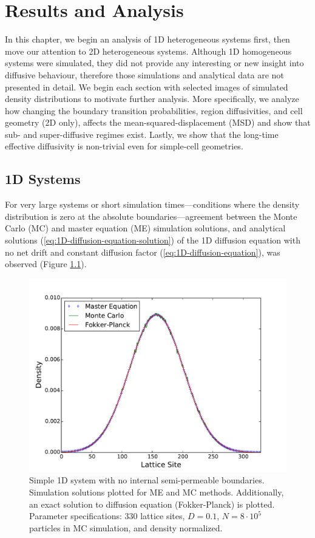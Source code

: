 \chapter{Results and Analysis}
\label{chapter:results-analysis}
	
	In this chapter, we begin an analysis of 1D heterogeneous systems first, then move our attention to 2D heterogeneous systems. Although 1D homogeneous systems were simulated, they did not provide any interesting or new insight into diffusive behaviour, therefore those simulations and analytical data are not presented in detail. We begin each section with selected images of simulated density distributions to motivate further analysis. More specifically, we analyze how changing the boundary transition probabilities, region diffusivities, and cell geometry (2D only), affects the mean-squared-displacement (MSD) and show that sub- and super-diffusive regimes exist. Lastly, we show that the long-time effective diffusivity is non-trivial even for simple-cell geometries.
	 
\section{1D Systems}
\label{sec:ra-1D}
	For very large systems or short simulation times---conditions where the density distribution is zero at the absolute boundaries---agreement between the Monte Carlo (MC) and master equation (ME) simulation solutions, and analytical solutions (\ref{eq:1D-diffusion-equation-solution}) of the 1D diffusion equation with no net drift and constant diffusion factor (\ref{eq:1D-diffusion-equation}), was observed (Figure \ref{fig:11U_homogeneous_plots_1D}). 

	\begin{figure}[h]
		\centering
		\includegraphics[width=1.0\linewidth]{../images/1D/11U_homogeneous_plots_1D}
		\caption{Simple 1D system with no internal semi-permeable boundaries. Simulation solutions plotted for ME and MC methods. Additionally, an exact solution to diffusion equation (Fokker-Planck) is plotted. Parameter specifications: 330 lattice sites, $ D = 0.1 $, $ N = 8\cdot10^5 $ particles in MC simulation, and density normalized.}
		\label{fig:11U_homogeneous_plots_1D}
	\end{figure}
	
